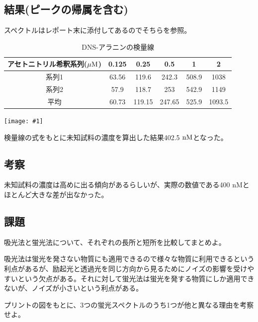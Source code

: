 \documentclass[a4paper,papersize,dvipdfmx]{jsarticle}
\newcommand{\pict}[2]{\begin{center} \texttt{[image: \#1]} \end{center}}   %
\begin{document}
\subsection*{結果(ピークの帰属を含む)}

スペクトルはレポート末に添付してあるのでそちらを参照。

\begin{table}[H]
\begin{center}
\begin{tabular}{|c|c|c|c|c|c|}
\hline
アセトニトリル希釈系列($\rm \mu M$) & 0.125 & 0.25   & 0.5    & 1     & 2      \\ \hline
系列1             & 63.56 & 119.6  & 242.3  & 508.9 & 1038   \\ \hline
系列2             & 57.9  & 118.7  & 253    & 542.9 & 1149   \\ \hline
平均              & 60.73 & 119.15 & 247.65 & 525.9 & 1093.5 \\ \hline
\end{tabular}
\caption{DNS-アラニンの検量線}
\end{center}
\end{table}

\pict{imgs/2-2-1.png}{8}

検量線の式をもとに未知試料の濃度を算出した結果402.5 $\rm  nM$となった。


\subsection*{考察}
未知試料の濃度は高めに出る傾向があるらしいが、実際の数値である400 nMとほとんど大きな差が出なかった。

\subsection*{課題}
\begin{tcolorbox}[colback=white,colbacktitle=black!10!white,coltitle=black,title={1}]
吸光法と蛍光法について、それぞれの長所と短所を比較してまとめよ。
\end{tcolorbox}

吸光法は蛍光を発さない物質にも適用できるので様々な物質に利用できるという利点があるが、励起光と透過光を同じ方向から見るためにノイズの影響を受けやすいという欠点がある。それに対して蛍光法は蛍光を発する物質にしか適用できないが、ノイズが小さいという利点がある。

\begin{tcolorbox}[colback=white,colbacktitle=black!10!white,coltitle=black,title={2}]
プリントの図をもとに、3つの蛍光スペクトルのうち1つが他と異なる理由を考察せよ。
\end{tcolorbox}
\end{document}
